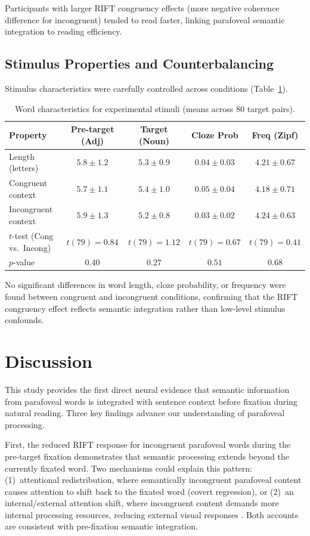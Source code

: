 \documentclass[11pt]{article}
\begin{document}
Participants with larger RIFT congruency effects (more negative coherence difference for incongruent) tended to read faster, linking parafoveal semantic integration to reading efficiency.

\subsection{Stimulus Properties and Counterbalancing}

Stimulus characteristics were carefully controlled across conditions (Table~\ref{tab:stimprops}).

\begin{table}[H]
\centering
\caption{Word characteristics for experimental stimuli (means across 80 target pairs).}
\label{tab:stimprops}
\begin{tabular}{@{}lcccc@{}}
\toprule
Property & Pre-target (Adj) & Target (Noun) & Cloze Prob & Freq (Zipf) \\
\midrule
Length (letters) & $5.8 \pm 1.2$ & $5.3 \pm 0.9$ & $0.04 \pm 0.03$ & $4.21 \pm 0.67$ \\
Congruent context & $5.7 \pm 1.1$ & $5.4 \pm 1.0$ & $0.05 \pm 0.04$ & $4.18 \pm 0.71$ \\
Incongruent context & $5.9 \pm 1.3$ & $5.2 \pm 0.8$ & $0.03 \pm 0.02$ & $4.24 \pm 0.63$ \\
$t$-test (Cong vs.\ Incong) & $t(79) = 0.84$ & $t(79) = 1.12$ & $t(79) = 0.67$ & $t(79) = 0.41$ \\
$p$-value & $0.40$ & $0.27$ & $0.51$ & $0.68$ \\
\bottomrule
\end{tabular}
\end{table}

No significant differences in word length, cloze probability, or frequency were found between congruent and incongruent conditions, confirming that the RIFT congruency effect reflects semantic integration rather than low-level stimulus confounds.

\section{Discussion}

This study provides the first direct neural evidence that semantic information from parafoveal words is integrated with sentence context before fixation during natural reading. Three key findings advance our understanding of parafoveal processing.

First, the reduced RIFT response for incongruent parafoveal words during the pre-target fixation demonstrates that semantic processing extends beyond the currently fixated word. Two mechanisms could explain this pattern: (1)~attentional redistribution, where semantically incongruent parafoveal content causes attention to shift back to the fixated word (covert regression), or (2)~an internal/external attention shift, where incongruent content demands more internal processing resources, reducing external visual responses \citep{schotter2012parafoveal}. Both accounts are consistent with pre-fixation semantic integration.
\end{document}
